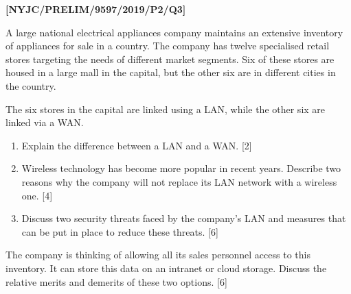 \item \textbf{{[}NYJC/PRELIM/9597/2019/P2/Q3{]} }

A large national electrical appliances company maintains an extensive
inventory of appliances for sale in a country. The company has twelve
specialised retail stores targeting the needs of different market
segments. Six of these stores are housed in a large mall in the capital,
but the other six are in different cities in the country. 

The six stores in the capital are linked using a LAN, while the other
six are linked via a WAN. 
\begin{enumerate}
\item Explain the difference between a LAN and a WAN. \hfill{} {[}2{]}
\item Wireless technology has become more popular in recent years. Describe
two reasons why the company will not replace its LAN network with
a wireless one. \hfill{} {[}4{]}
\item Discuss two security threats faced by the company\textquoteright s
LAN and measures that can be put in place to reduce these threats.
\hfill{} {[}6{]}
\end{enumerate}
The company is thinking of allowing all its sales personnel access
to this inventory. It can store this data on an intranet or cloud
storage. Discuss the relative merits and demerits of these two options.
\hfill{}{[}6{]}